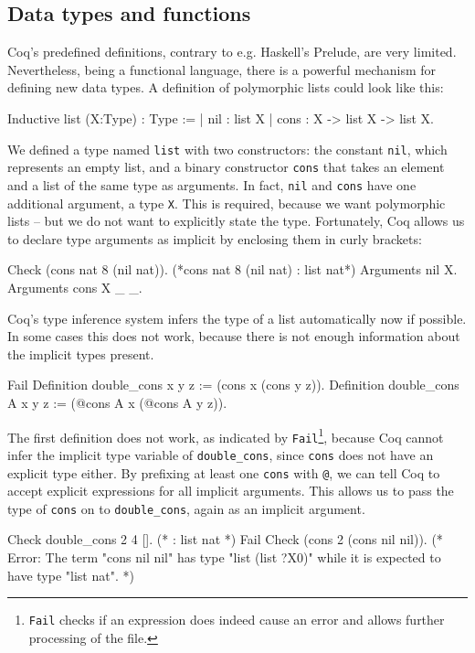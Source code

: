 \documentclass[fleqn]{scrreprt}
\newcommand{\coqinline}[1]{\texttt{#1}}
\begin{document}
\subsection{Data types and functions}
Coq's predefined definitions, contrary to e.g. Haskell's Prelude, are very limited. Nevertheless, being a functional language, there is a powerful mechanism for defining new data types. A definition of polymorphic lists could look like this:
\begin{coqcode}
Inductive list (X:Type) : Type :=
  | nil  : list X
  | cons : X -> list X -> list X.
\end{coqcode}
We defined a type named \coqinline{list} with two constructors: the constant \coqinline{nil}, which represents an empty list, and a binary constructor \coqinline{cons} that takes an element and a list of the same type as arguments. In fact, \coqinline{nil} and \coqinline{cons} have one additional argument, a type \coqinline{X}. This is required, because we want polymorphic lists -- but we do not want to explicitly state the type. Fortunately, Coq allows us to declare type arguments as implicit by enclosing them in curly brackets:
\begin{coqcode}
Check (cons nat 8 (nil nat)). (*cons nat 8 (nil nat) : list nat*)
Arguments nil {X}.
Arguments cons {X} _ _.
\end{coqcode}
Coq's type inference system infers the type of a list automatically now if possible. In some cases this does not work, because there is not enough information about the implicit types present. 
\begin{coqcode}
Fail Definition double_cons x y z := (cons x (cons y z)).
Definition double_cons {A} x y z := (@cons A x (@cons A y z)).
\end{coqcode}
The first definition does not work, as indicated by \coqinline{Fail}\footnote{\coqinline{Fail} checks if an expression does indeed cause an error and allows further processing of the file.}, because Coq cannot infer the implicit type variable of \coqinline{double_cons}, since \coqinline{cons} does not have an explicit type either. By prefixing at least one \coqinline{cons} with \coqinline{@}, we can tell Coq to accept explicit expressions for all implicit arguments. This allows us to pass the type of \coqinline{cons} on to \coqinline{double_cons}, again as an implicit argument.
\begin{coqcode}
Check double_cons 2 4 []. (* : list nat *)
Fail Check (cons 2 (cons nil nil)). 
(* Error: The term "cons nil nil" has type "list (list ?X0)"
while it is expected to have type "list nat". *)
\end{coqcode}
\end{document}
